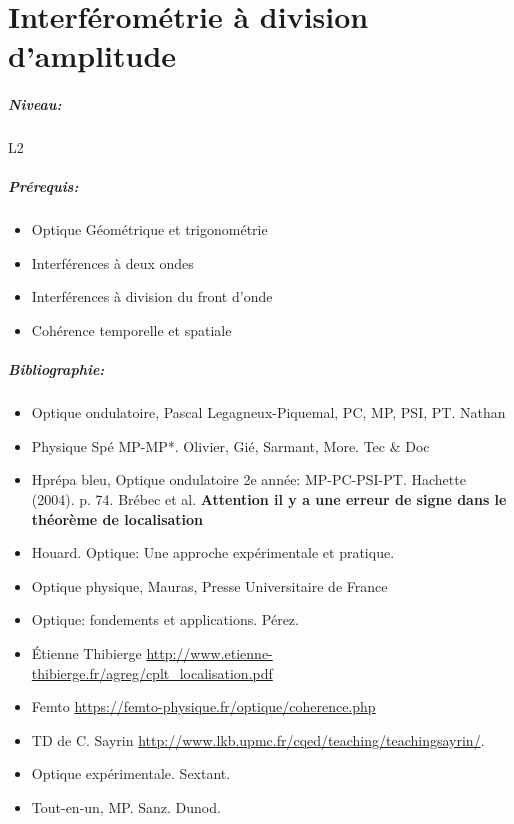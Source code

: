 \documentclass[11pt]{report}
\numberwithin{figure}{section}
\numberwithin{equation}{section}
\numberwithin{table}{section}
\newcommand{\1}{\boldsymbol{1}}
\begin{document}


\chapter{Interférométrie à division d'amplitude}


\paragraph*{Niveau:} L2

\paragraph*{Prérequis:} 
\begin{itemize}
\item Optique Géométrique et trigonométrie
\item Interférences à deux ondes
\item Interférences à division du front d'onde
\item Cohérence temporelle et spatiale
\end{itemize}

\paragraph*{Bibliographie:}
\begin{itemize}
\item Optique ondulatoire, Pascal Legagneux-Piquemal, PC, MP, PSI, PT. Nathan
\item Physique Spé MP-MP*. Olivier, Gié, Sarmant, More. Tec \& Doc
\item Hprépa bleu, Optique ondulatoire 2e année: MP-PC-PSI-PT. Hachette (2004). p. 74. Brébec et al. \textbf{Attention il y a une erreur de signe
dans le théorème de localisation}
\item Houard. Optique: Une approche expérimentale et pratique.
\item Optique physique, Mauras, Presse Universitaire de France
\item Optique: fondements et applications. Pérez.
\item Étienne Thibierge \url{http://www.etienne-thibierge.fr/agreg/cplt_localisation.pdf}
\item Femto \url{https://femto-physique.fr/optique/coherence.php}
\item TD de C. Sayrin \url{http://www.lkb.upmc.fr/cqed/teaching/teachingsayrin/}.
\item Optique expérimentale. Sextant.
\item Tout-en-un, MP. Sanz. Dunod.
\end{itemize}
\end{document}
